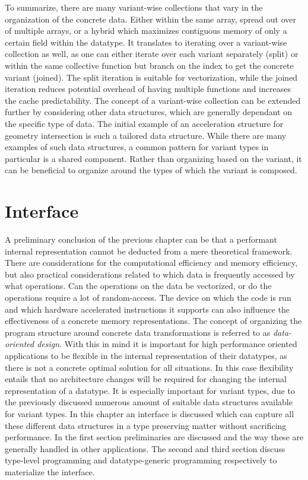 \documentclass{article}
\begin{document}
To summarize, there are many variant-wise collections that vary in the organization of the concrete data. 
Either within the same array, spread out over of multiple arrays, or a hybrid which maximizes contiguous memory of only a certain field within the datatype. 
It translates to iterating over a variant-wise collection as well, as one can either iterate over each variant separately (split) or within the same collective function but branch on the index to get the concrete variant (joined).
The split iteration is suitable for vectorization, while the joined iteration reduces potential overhead of having multiple functions and increases the cache predictability.
The concept of a variant-wise collection can be extended further by considering other data structures, which are generally dependant on the specific type of data.
The initial example of an acceleration structure for geometry intersection is such a tailored data structure.
While there are many examples of such data structures, a common pattern for variant types in particular is a shared component.
Rather than organizing based on the variant, it can be beneficial to organize around the types of which the variant is composed.

\newpage

\section{Interface}

A preliminary conclusion of the previous chapter can be that a performant internal representation cannot be deducted from a mere theoretical framework.
There are considerations for the computational efficiency and memory efficiency, but also practical considerations related to which data is frequently accessed by what operations.
Can the operations on the data be vectorized, or do the operations require a lot of random-access.
The device on which the code is run and which hardware accelerated instructions it supports can also influence the effectiveness of a concrete memory representations.
The concept of organizing the program structure around concrete data transformations is referred to as {\it data-oriented design}.
With this in mind it is important for high performance oriented applications to be flexible in the internal representation of their datatypes, as there is not a concrete optimal solution for all situations.
In this case flexibility entails that no architecture changes will be required for changing the internal representation of a datatype.
It is especially important for variant types, due to the previously discussed numerous amount of suitable data structures available for variant types.
In this chapter an interface is discussed which can capture all these different data structures in a type preserving matter without sacrificing performance. 
In the first section preliminaries are discussed and the way these are generally handled in other applications.
The second and third section discuss type-level programming and datatype-generic programming respectively to materialize the interface.
\end{document}
